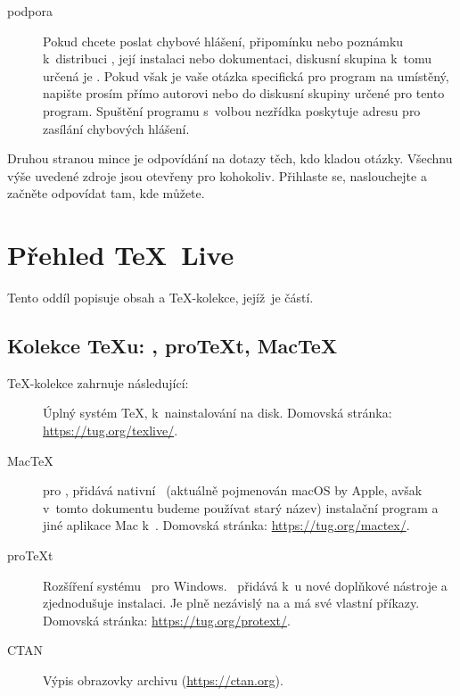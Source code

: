 \documentclass[\classoptions,slovak,english,czech]{\classname}
\newcommand{\ctt}{\url{news:comp.text.tex}}
\newcommand\TKCS{\textsf{\TeX-kolekce}}
\begin{document}
\begin{description}
\item [podpora \TL{}] Pokud chcete poslat
  chybové hlášení, připomínku nebo poznámku k~distribuci
  \TL{}, její instalaci nebo dokumentaci,
  diskusní skupina k~tomu určená je .
  Pokud však je vaše otázka specifická pro program na
  \TL{} umístěný, napište prosím přímo autorovi nebo do diskusní
  skupiny určené pro tento program. Spuštění programu 
  s~volbou  nezřídka
  poskytuje adresu pro zasílání chybových hlášení.
\end{description}

\noindent
Druhou stranou mince je odpovídání na dotazy těch, kdo kladou otázky.
Všechnu výše uvedené zdroje jsou otevřeny pro kohokoliv.
Přihlaste se, naslouchejte a začněte odpovídat tam, kde můžete. 

\section{Přehled \protect\TeX\protect\ Live}
\label{sec:overview.tl}

Tento oddíl popisuje obsah \TL{} a \TKCS{}, jejíž~je částí.



\subsection{Kolekce \protect\TeX{}u: \protect\TL, pro\protect\TeX{}t, Mac\protect\TeX}
\label{sec:tlcoll.dists}

\DVD{} \TKCS{} zahrnuje následující:

\begin{description}
\item [\TL] Úplný systém \TeX{}, k~nainstalování na disk.
Domovská stránka: \url{https://tug.org/texlive/}.

\item [Mac\TeX] pro \MacOSX, přidává nativní \MacOSX\ 
(aktuálně pojmenován macOS by Apple, avšak v~tomto dokumentu budeme používat starý název) 
instalační program a jiné aplikace Mac k~\TL{}. Domovská stránka:
\url{https://tug.org/mactex/}.

\item [pro\TeX{}t] Rozšíření systému \MIKTEX\ pro Windows.
\ProTeXt\ přidává k~\MIKTEX u nové doplňkové nástroje 
a zjednodušuje instalaci. Je plně nezávislý na \TL{} 
a má své vlastní příkazy. 
Domovská stránka: \url{https://tug.org/protext/}.

\item [CTAN] Výpis obrazovky archivu \CTAN{} (\url{https://ctan.org}).

\end{description}
\end{document}
